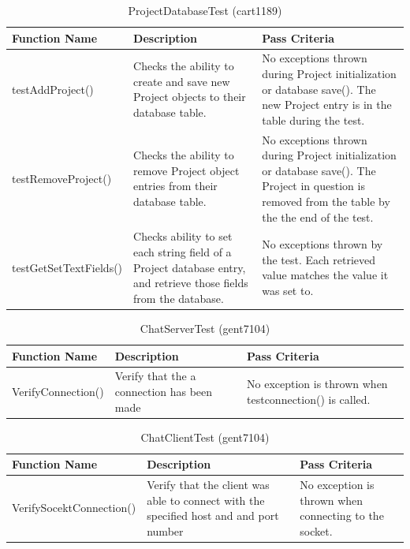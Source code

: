 \documentclass[14pt, a4paper]{article}
\begin{document}
\begin{table}[h]
	\centering
	\caption{ProjectDatabaseTest (cart1189)}
	\begin{tabular}{|p{4cm}|p{5cm}|p{6cm}|}
		\hline
		\textbf{Function Name} & \textbf{Description} & \textbf{Pass Criteria}  \\\hline
		testAddProject() & Checks the ability to create and save new Project objects to their database table. & No exceptions thrown during Project initialization or database save(). The new Project entry is in the table during the test. \\\hline
		testRemoveProject() & Checks the ability to remove Project object entries from their database table. & No exceptions thrown during Project initialization or database save(). The Project in question is removed from the table by the the end of the test. \\\hline
		testGetSetTextFields() & Checks ability to set each string field of a Project database entry, and retrieve those fields from the database. & No exceptions thrown by the test. Each retrieved value matches the value it was set to. \\\hline
	\end{tabular}
\end{table}

\begin{table}[h]
	\centering
	\caption{ChatServerTest (gent7104)}
	\begin{tabular}{|p{4cm}|p{5cm}|p{6cm}|}
		\hline
		\textbf{Function Name} & \textbf{Description} & \textbf{Pass Criteria}  \\\hline
		VerifyConnection() & Verify that the a connection has been made & No exception is thrown when testconnection() is called. \\\hline
	\end{tabular}
\end{table}

\begin{table}[h]
	\centering
	\caption{ChatClientTest (gent7104)}
	\begin{tabular}{|p{4cm}|p{5cm}|p{6cm}|}
		\hline
		\textbf{Function Name} & \textbf{Description} & \textbf{Pass Criteria}  \\\hline
		VerifySocektConnection() & Verify that the client was able to connect with the specified host and and port number & No exception is thrown when connecting to the socket. \\\hline
	\end{tabular}
\end{table}
\end{document}
